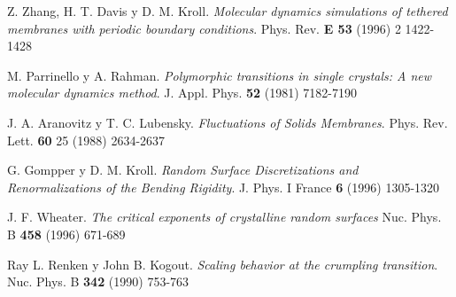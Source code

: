 \begin{thebibliography}{99}
 Z. Zhang, H. T. Davis y D. M. Kroll.
\textit{Molecular dynamics simulations of tethered membranes with periodic
  boundary conditions}.
 Phys. Rev. \textbf{E 53} (1996) 2 1422-1428

 M. Parrinello y A. Rahman.
\textit{Polymorphic transitions in single crystals: A new molecular dynamics
  method}.
J. Appl. Phys. \textbf{52} (1981) 7182-7190  

 J. A. Aranovitz y T. C. Lubensky. 
\textit{Fluctuations of Solids Membranes}.
Phys. Rev. Lett. \textbf{60} 25 (1988) 2634-2637

G. Gompper y D. M. Kroll.
\textit{Random Surface Discretizations and Renormalizations of the Bending
  Rigidity}.
J. Phys. I France \textbf{6} (1996) 1305-1320

J. F. Wheater.
\textit{The critical exponents of crystalline random surfaces}
Nuc. Phys. B \textbf{458} (1996) 671-689

 Ray L. Renken y John B. Kogout.
\textit{Scaling behavior at the crumpling transition}.
Nuc. Phys. B \textbf{342} (1990) 753-763
\end{thebibliography}

